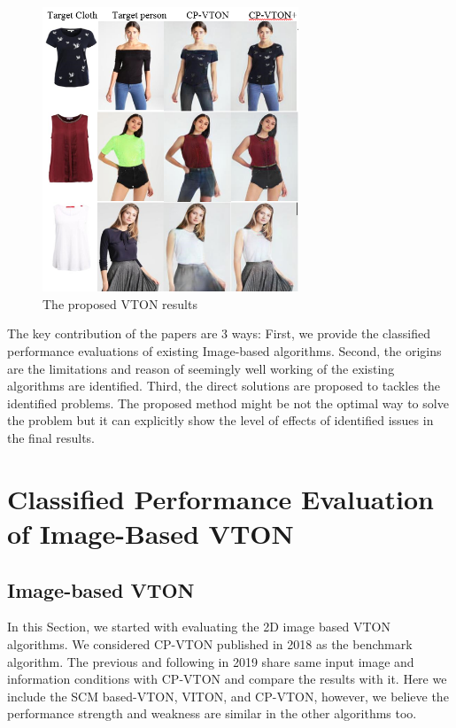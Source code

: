 \documentclass[runningheads]{llncs}
\begin{document}
\begin{figure}
\centering
\includegraphics[height=8.5cm, scale=1]{figures/cpvton_cpvton+keyresult.png}   %
\caption{The proposed VTON results}
\label{fig:cpvton_cpvton+keyresult}
\end{figure}


The key contribution of the papers are 3 ways: First, we provide the classified performance evaluations of existing Image-based algorithms. Second, the origins are the limitations and reason of seemingly well working of the existing algorithms are  identified. Third, the direct solutions are proposed to tackles the identified problems. The proposed method might be not the optimal way to solve the problem but it can explicitly show the level of effects of identified issues in the final results.

 

\section{Classified Performance Evaluation of Image-Based VTON}

\subsection{Image-based VTON}

In this Section, we started with evaluating the 2D image based VTON algorithms. We considered CP-VTON\cite{Wang2018TowardCI} published in 2018 as the benchmark algorithm. The previous and following in 2019 share same input image and information conditions with CP-VTON and compare the results with it. Here we include the SCM based-VTON, VITON\cite{Han2017VITONAI}, and  CP-VTON\cite{Wang2018TowardCI}, however, we believe the performance strength and weakness are similar in the other algorithms too.
\end{document}
